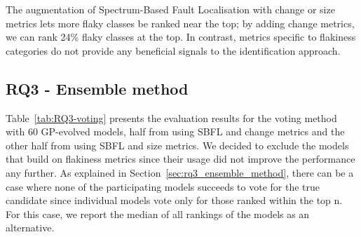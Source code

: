 \begin{table}[ht]
\caption{Frequency of metrics in GP-evolved \formulas (from 0 to 1). `Changes' and `Dev' denote \textit{`Unique Changes'} and \textit{`Developers'}, respectively. The column `SBFL' contains the average frequency of the four SBFL metrics. 
\label{tab:RQ2-distr}}
\centering
{}
\end{table}


\begin{tcolorbox}
The augmentation of Spectrum-Based Fault Localisation with change or size metrics lets more flaky classes be ranked near the top; by adding change metrics, we can rank 24\% flaky classes at the top. In contrast, metrics specific to flakiness categories do not provide any beneficial signals to the identification approach. 
\end{tcolorbox}

\subsection{RQ3 - Ensemble method}

Table~\ref{tab:RQ3-voting} presents the evaluation results for the voting method with 60 GP-evolved models, half from using SBFL and change metrics and the other half from using SBFL and size metrics.
We decided to exclude the models that build on flakiness metrics since their usage did not improve the performance any further.
As explained in Section~\ref{sec:rq3_ensemble_method}, there can be a case where none of the participating models succeeds to vote for the true candidate since individual models vote only for those ranked within the top n. For this case, we report the median of all rankings of the models as an alternative. 

